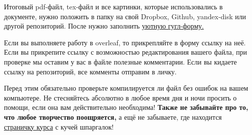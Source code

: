 \documentclass[12pt, a4paper, oneside]{article}
\begin{document}
Итоговый pdf-файл, tex-файл и все картинки, которые использовались в документе, нужно положить в папку на свой Dropbox, Github, yandex-disk или другой репозиторий. После нужно заполнить \href{https://docs.google.com/forms/d/e/1FAIpQLSe11kxKVfv07iCL1E9yNX7ll9swKImiVwRr1H70lslGzInRSg/viewform}{уютную гугл-форму.}  

Если вы выполняете работу в overleaf, то прикрепляйте в форму ссылку на неё. Если вы прикрепите ссылку с возможностью редактирования вашего файла, при проверке мы оставим у вас в файле полезные комментарии. Если вы кидаете ссылку на репозиторий, все комменты отправим в личку.

Перед этим обязательно проверьте компилируется ли файл без ошибок на вашем компьютере. Не стесняйтесь абсолютно в любое время дня и ночи просить о помощи, если она вам действительно необходима! \textbf{Также не забывайте про то, что любое творчество поощряется,} а ещё не забываете, где  находится  \href{https://fulyankin.github.io/LaTeX/}{страничку курса} с кучей шпаргалок!
\end{document}
